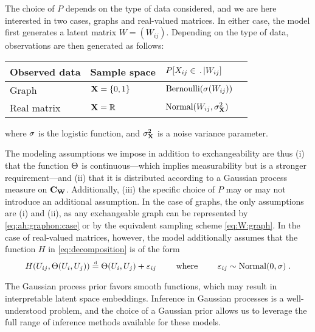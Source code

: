 The choice of $P$ depends on the type of data considered, and we are here interested in two cases, graphs and 
real-valued matrices.
In either case, the model first generates a latent matrix $W=(W_{ij})$. 
Depending on the type of data, observations are then generated as follows:
\begin{center}
  \begin{tabular}{llll} 
    Observed data & Sample space & $P[X_{ij}\in\,.\,|W_{ij}]$  \\
    \midrule
    Graph & $\mathbf{X}=\lbrace{0,1}\rbrace$  & $\mbox{\rm Bernoulli}(\sigma(W_{ij}))$
    \vspace{2pt}\\
    Real matrix & $\mathbf{X}=\mathbb{R}$  & $\mbox{Normal}(W_{ij},\sigma_{\mathbf{X}}^2)$\\
  \end{tabular}
\end{center}
where $\sigma$ is the logistic function, and $\sigma_{\mathbf{X}}^2$ is a noise variance parameter.

The modeling assumptions we impose in addition to exchangeability are thus (i) that the function $\Theta$ is continuous---which implies measurability but is a stronger requirement---and (ii) that it is distributed according to a Gaussian process measure on $\mathbf{C}_{\mathbf{W}}$.
Additionally, (iii) the specific choice of $P$ may or may not introduce an additional assumption.
In the case of graphs, the only assumptions are (i) and (ii), 
as any exchangeable graph can be represented by \eqref{eq:ah:graphon:case} or by the equivalent sampling scheme \eqref{eq:W:graph}.
In the case of real-valued matrices, however, the model additionally assumes that the function 
$H$ in \eqref{eq:decomposition} is of the form
\begin{equation}
  H(U_{ij},\Theta(U_i,U_j))\stackrel{\mbox{\tiny d}}{=} \Theta(U_i,U_j)+\varepsilon_{ij} \qquad\text{ where }\qquad \varepsilon_{ij}\sim\mbox{Normal}(0,\sigma)\;.
\end{equation}

The Gaussian process prior favors smooth functions, which may result in interpretable latent space embeddings.
Inference in Gaussian processes is a well-understood problem, and the choice of a Gaussian prior allows us to leverage the full range of inference methods available for these models.



